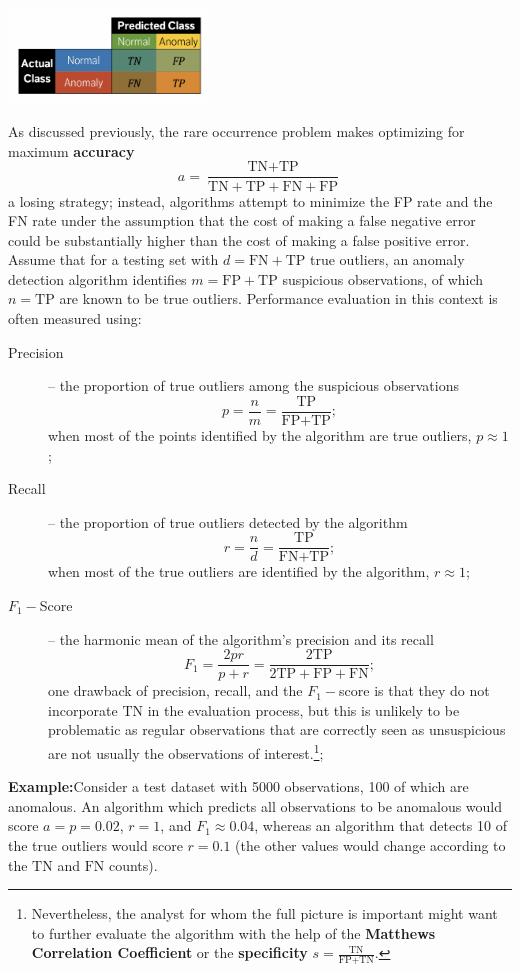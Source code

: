 \documentclass[20pt,landscape,footrule,headrule]{foils}
\begin{document}
\begin{center}
\qquad\includegraphics[width=0.4\textwidth]{Images/Confusion_EN.png}\par\noindent
As discussed previously, the rare occurrence problem makes optimizing for maximum \textbf{accuracy} $$a=\frac{\text{TN}+\text{TP}}{\text{TN}+\text{TP}+\text{FN}+\text{FP}}$$ a losing strategy; instead, algorithms attempt to minimize the FP rate and the FN rate under the assumption that the cost of making a false negative error could be substantially higher than the cost of making a false positive error. \newpage \noindent Assume that for a testing set with $d=\text{FN}+\text{TP}$ true outliers, an anomaly detection algorithm identifies $m=\text{FP}+\text{TP}$ suspicious observations, of which $n=\text{TP}$ are known to be true outliers. Performance evaluation in this context is often measured using: 
\begin{description}
\item[Precision]-- the proportion of true outliers among the suspicious observations $$p=\frac{n}{m}=\frac{\text{TP}}{\text{FP}+\text{TP}};$$ when most of the points identified by the algorithm are true outliers, $p\approx 1$;
\item[Recall]-- the proportion of true outliers detected by the algorithm
$$r=\frac{n}{d}=\frac{\text{TP}}{\text{FN}+\text{TP}};$$ when most of the true outliers are identified by the algorithm, $r\approx 1$;
\item[$F_1-$Score]-- the harmonic mean of the algorithm's precision and its recall 
$$F_1=\frac{2pr}{p+r}=\frac{2\text{TP}}{2\text{TP}+\text{FP}+\text{FN}};$$ one drawback of precision, recall, and the $F_1-$score is that they do not incorporate $\text{TN}$ in the evaluation process, but this is unlikely to be problematic as regular observations that are correctly seen as unsuspicious are not usually the observations of interest.\footnote{Nevertheless, the analyst for whom the full picture is important might want to further evaluate the algorithm with the help of the \textbf{Matthews Correlation Coefficient} \cite{W_MCC} or the \textbf{specificity} $s=\frac{\text{TN}}{\text{FP}+\text{TN}}$.};
\end{description}
\textbf{Example:}Consider a test dataset with 5000 observations, 100 of which are anomalous. An algorithm which predicts all observations to be anomalous would score $a=p=0.02$, $r=1$, and $F_1\approx 0.04$, whereas an algorithm that detects 10 of the true outliers would score $r=0.1$ (the other values would change according to the $\text{TN}$ and $\text{FN}$ counts). 

\end{center}
\end{document}
